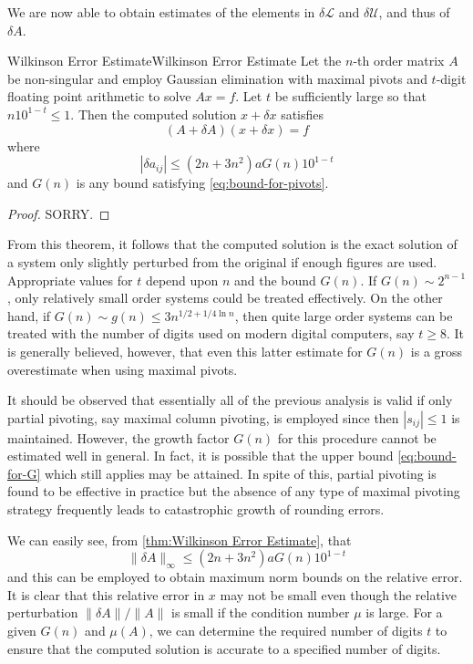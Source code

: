 \documentclass[../main.tex]{subfiles}
\begin{document}
We are now able to obtain estimates of the elements in $\delta \mathcal{L}$ and $\delta \mathcal{U}$, and thus of $\delta A$.

\begin{theorem}{Wilkinson Error Estimate}{Wilkinson Error Estimate}
	Let the $n$-th order matrix $A$ be non-singular and employ Gaussian elimination with maximal pivots and $t$-digit floating point arithmetic to solve $A x = f$. Let $t$ be sufficiently large so that $n 10^{1-t} \leq 1$. Then the computed solution $x + \delta x$ satisfies
	\begin{equation*}
		(A + \delta A)(x + \delta x) = f
	\end{equation*}
	where
	\begin{equation}
		| \delta a_{ij} | \leq (2n + 3n^2) a G(n) 10^{1-t}
	\end{equation}
	and $G(n)$ is any bound satisfying \eqref{eq:bound-for-pivots}.
\end{theorem}
\begin{proof}
	SORRY.
\end{proof}

From this theorem, it follows that the computed solution is the exact solution of a system only slightly perturbed from the original if enough figures are used. Appropriate values for $t$ depend upon $n$ and the bound $G(n)$. If $G(n) \sim 2^{n-1}$, only relatively small order systems could be treated effectively. On the other hand, if $G(n) \sim g(n) \leq 3 n^{1/2 + 1/4 \ln n}$, then quite large order systems can be treated with the number of digits used on modern digital computers, say $t \geq 8$. It is generally believed, however, that even this latter estimate for $G(n)$ is a gross overestimate when using maximal pivots.

It should be observed that essentially all of the previous analysis is valid if only partial pivoting, say maximal column pivoting, is employed since then $|s_{ij}| \leq 1$ is maintained. However, the growth factor $G(n)$ for this procedure cannot be estimated well in general. In fact, it is possible that the upper bound \eqref{eq:bound-for-G} which still applies may be attained. In spite of this, partial pivoting is found to be effective in practice but the absence of any type of maximal pivoting strategy frequently leads to catastrophic growth of rounding errors.

We can easily see, from \ref{thm:Wilkinson Error Estimate}, that
\begin{equation*}
	\| \delta A \|_{\infty} \leq (2n + 3n^2) a G(n) 10^{1-t}
\end{equation*}
and this can be employed to obtain maximum norm bounds on the relative error. It is clear that this relative error in $x$ may not be small even though the relative perturbation $ \| \delta A \| / \| A \|$ is small if the condition number $\mu$ is large. For a given $G(n)$ and $\mu(A)$, we can determine the required number of digits $t$ to ensure that the computed solution is accurate to a specified number of digits.
\end{document}
